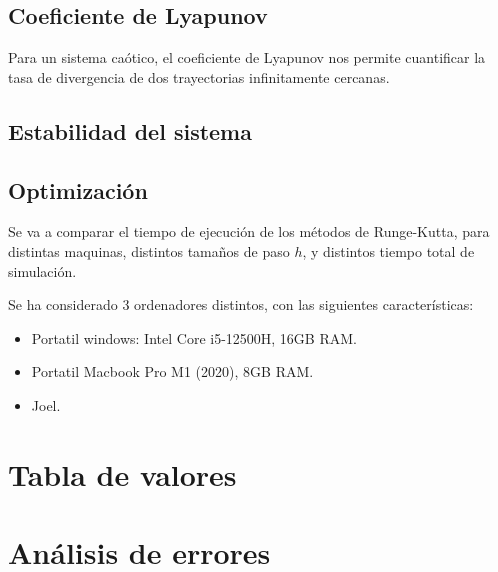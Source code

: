 \documentclass[11pt, twoside]{article} %
\begin{document}
\subsection{Coeficiente de Lyapunov}

Para un sistema caótico, el coeficiente de Lyapunov nos permite
cuantificar la tasa de divergencia de dos trayectorias infinitamente
cercanas.

\subsection{Estabilidad del sistema}

\subsection{Optimización}

Se va a comparar el tiempo de ejecución de los métodos de Runge-Kutta, para 
distintas maquinas, distintos tamaños de paso $h$, y distintos tiempo total 
de simulación.

Se ha considerado 3 ordenadores distintos, con las siguientes características:
\begin{itemize}
    \item Portatil windows: Intel Core i5-12500H, 16GB RAM.
    \item Portatil Macbook Pro M1 (2020), 8GB RAM.
    \item Joel.
\end{itemize}


\newpage

\appendix

\section{Tabla de valores}


\newpage

\section{Análisis de errores}
\end{document}
